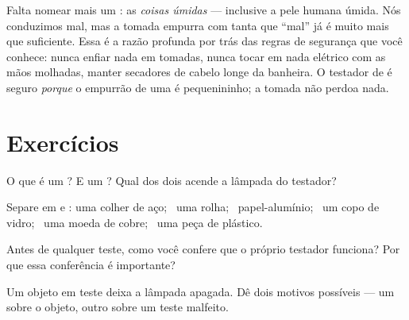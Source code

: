 \begin{remark}\label{rem:g4:conductors-insulators:safety}
Falta nomear mais um : as \emph{coisas úmidas} --- inclusive
a pele humana úmida. Nós conduzimos mal, mas a tomada empurra com
tanta  que ``mal'' já é muito mais que suficiente. Essa é a
razão profunda por trás das regras de segurança que você conhece:
nunca enfiar nada em tomadas, nunca tocar em nada elétrico com as
mãos molhadas, manter secadores de cabelo longe da banheira. O
testador de  é seguro \emph{porque} o empurrão de uma  é
pequenininho; a tomada não perdoa nada.
\end{remark}

\section{Exercícios}

\begin{exercise}[$\star$]\label{exo:g4:conductors-insulators:1}
O que é um ? E um ? Qual dos dois acende a lâmpada do
testador?
\end{exercise}

\begin{exercise}[$\star$]\label{exo:g4:conductors-insulators:2}
Separe em  e : uma colher de aço; \ uma rolha; \
papel-alumínio; \ um copo de vidro; \ uma moeda de cobre; \ uma peça
de plástico.
\end{exercise}

\begin{exercise}[$\star$]\label{exo:g4:conductors-insulators:3}
Antes de qualquer teste, como você confere que o próprio testador
funciona? Por que essa conferência é importante?
\end{exercise}

\begin{exercise}[$\star$]\label{exo:g4:conductors-insulators:4}
Um objeto em teste deixa a lâmpada apagada. Dê dois motivos possíveis
--- um sobre o objeto, outro sobre um teste malfeito.
\end{exercise}

